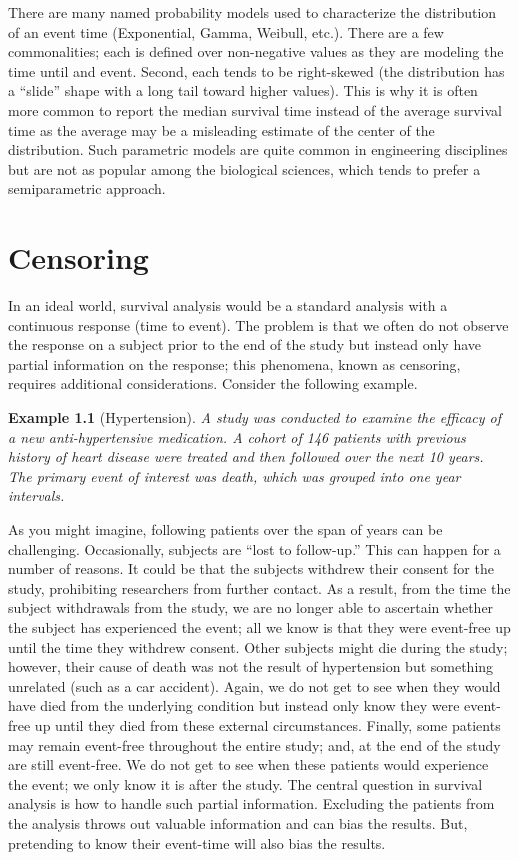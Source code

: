 \documentclass[
]{book}
\theoremstyle{plain}
\theoremstyle{mydefn}
\theoremstyle{myexmpl}
\newtheorem{example}{Example}[chapter]
\theoremstyle{remark}
\begin{document}
There are many named probability models used to characterize the distribution of an event time (Exponential, Gamma, Weibull, etc.). There are a few commonalities; each is defined over non-negative values as they are modeling the time until and event. Second, each tends to be right-skewed (the distribution has a ``slide'' shape with a long tail toward higher values). This is why it is often more common to report the median survival time instead of the average survival time as the average may be a misleading estimate of the center of the distribution. Such parametric models are quite common in engineering disciplines but are not as popular among the biological sciences, which tends to prefer a semiparametric approach.

\hypertarget{surv-censoring}{%
\chapter{Censoring}\label{surv-censoring}}

In an ideal world, survival analysis would be a standard analysis with a continuous response (time to event). The problem is that we often do not observe the response on a subject prior to the end of the study but instead only have partial information on the response; this phenomena, known as censoring, requires additional considerations. Consider the following example.

\begin{example}[Hypertension]
A study was conducted to examine the efficacy of a new anti-hypertensive medication. A cohort of 146 patients with previous history of heart disease were treated and then followed over the next 10 years. The primary event of interest was death, which was grouped into one year intervals.
\end{example}

As you might imagine, following patients over the span of years can be challenging. Occasionally, subjects are ``lost to follow-up.'' This can happen for a number of reasons. It could be that the subjects withdrew their consent for the study, prohibiting researchers from further contact. As a result, from the time the subject withdrawals from the study, we are no longer able to ascertain whether the subject has experienced the event; all we know is that they were event-free up until the time they withdrew consent. Other subjects might die during the study; however, their cause of death was not the result of hypertension but something unrelated (such as a car accident). Again, we do not get to see when they would have died from the underlying condition but instead only know they were event-free up until they died from these external circumstances. Finally, some patients may remain event-free throughout the entire study; and, at the end of the study are still event-free. We do not get to see when these patients would experience the event; we only know it is after the study. The central question in survival analysis is how to handle such partial information. Excluding the patients from the analysis throws out valuable information and can bias the results. But, pretending to know their event-time will also bias the results.
\end{document}
